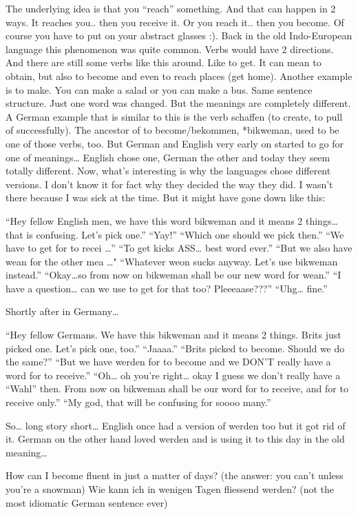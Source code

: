 \documentclass[a4paper,12pt]{article}
\begin{document}
\begin{adjustwidth}{2em}{0pt}
\begin{adjustwidth}{3em}{0pt}
The underlying idea is that you “reach” something. And that can happen in 2
ways. It reaches you.. then you receive it. Or you reach it.. then you become.
Of course you have to put on your abstract glasses :).  Back in the old
Indo-European language this phenomenon was quite common. Verbs would have 2
directions. And there are still some verbs like this around. Like to get. It can
mean to obtain, but also to become and even to reach places (get home). Another
example is to make. You can make a salad or you can make a bus. Same sentence
structure. Just one word was changed. But the meanings are completely different.
A German example that is similar to this is the verb schaffen (to create, to
pull of successfully).  The ancestor of to become/bekommen, *bikweman, used to
be one of those verbs, too. But German and English very early on started to go
for one of meanings… English chose one, German the other and today they seem
totally different. Now, what’s interesting is why the languages chose different
versions. I don’t know it for fact why they decided the way they did. I wasn’t
there because I was sick at the time. But it might have gone down like this:

“Hey fellow English men, we have this word bikweman
and it means 2 things… that is confusing. Let’s pick one.”
“Yay!”
“Which one should we pick then.”
“We have to get for to recei \ldots”
“To get kicks ASS… best word ever.”
“But we also have wean for the other mea \ldots"
“Whatever weon sucks anyway. Let’s use bikweman instead.”
“Okay…so from now on bikweman shall be our new word
for wean.”
“I have a question… can we use to get for that too? Pleeeaase???”
“Uhg… fine.”

Shortly after in Germany…

“Hey fellow Germans. We have this bikweman and it means 2
things. Brits just picked one. Let’s pick one, too.”
“Jaaaa.”
“Brits picked to become. Should we do the same?”
“But we have werden for to become and we DON’T really have a
word for to receive.”
“Oh… oh you’re right… okay I guess we don’t really have a “Wahl” then. From now on bikweman shall be our word
for to receive, and for to receive only.”
“My god, that will be confusing for soooo many.”

 So… long story short… English once had a version of werden too but it got rid of it. German on the other hand loved werden and is using it to this day in the old meaning…

    How can I become fluent in just a matter of days? (the answer: you can’t unless you’re a snowman)
    Wie kann ich in wenigen Tagen fliessend werden?
    (not the most idiomatic German sentence ever)


\end{adjustwidth}
\end{adjustwidth}
\end{document}
